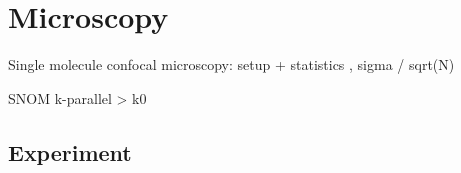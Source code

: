 \renewcommand{\lastmod}{September 24, 2021}
\renewcommand{\chapterauthors}{Markus Lippitz}


\chapter{Microscopy}




Single molecule confocal microscopy: setup + statistics , sigma / sqrt(N)

SNOM k-parallel > k0




\section{Experiment}






\printbibliography[segment=\therefsegment,heading=subbibliography]
